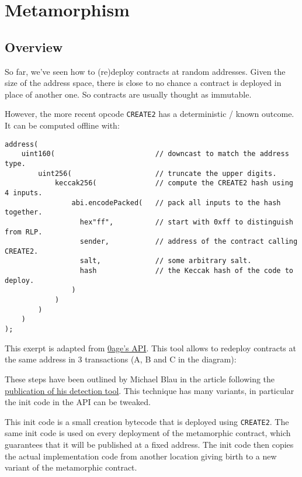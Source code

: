 \section{Metamorphism} \label{sec:metamorphism}

\subsection{Overview}

So far, we've seen how to (re)deploy contracts at random addresses.
Given the size of the address space, there is close to no chance a contract is deployed in place of another one.
So contracts are usually thought as immutable.

However, the more recent opcode \lstinline{CREATE2} has a deterministic / known outcome.
It can be computed offline with:

\begin{lstlisting}[language=Solidity]
address(
    uint160(                        // downcast to match the address type.
        uint256(                    // truncate the upper digits.
            keccak256(              // compute the CREATE2 hash using 4 inputs.
                abi.encodePacked(   // pack all inputs to the hash together.
                  hex"ff",          // start with 0xff to distinguish from RLP.
                  sender,           // address of the contract calling CREATE2.
                  salt,             // some arbitrary salt.
                  hash              // the Keccak hash of the code to deploy.
                )
            )
        )
    )
);
\end{lstlisting}

This exerpt is adapted from \href{\urlcodemetamorphicapi}{0age's API}.
This tool allows to redeploy contracts at the same address in 3 transactions (A, B and C in the diagram):



These steps have been outlined by Michael Blau in the article following the \href{\urlarticlemetamorphismtool}{publication of his detection tool}. 
This technique has many variants, in particular the init code in the API can be tweaked.

This init code is a small creation bytecode that is deployed using \lstinline{CREATE2}.
The same init code is used on every deployment of the metamorphic contract, which guarantees that it will be published at a fixed address.
The init code then copies the actual implementation code from another location giving birth to a new variant of the metamorphic contract.

